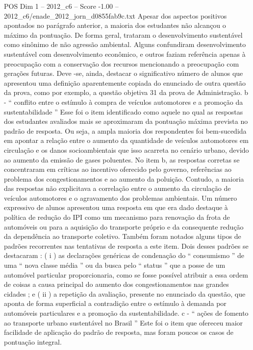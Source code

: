 \begin{textsample}{POS Dim 1 – 2012\_c6 – Score -1.00 – 2012\_c6/enade\_2012\_jorn\_d0855fab9c.txt}
Apesar dos aspectos positivos apontados no parágrafo anterior, a maioria dos estudantes não alcançou o máximo da pontuação.
De forma geral, trataram o desenvolvimento sustentável como sinônimo de não agressão ambiental.
Alguns confundiram desenvolvimento sustentável com desenvolvimento econômico, e outros faziam referência apenas à preocupação com a conservação dos recursos mencionando a preocupação com gerações futuras.
Deve -se, ainda, destacar o significativo número de alunos que apresentou uma definição aparentemente copiada do enunciado de outra questão da prova, como por exemplo, a questão objetiva 31 da prova de Administração. b - “ conflito entre o estímulo à compra de veículos automotores e a promoção da sustentabilidade ” Esse foi o item identificado como aquele no qual as respostas dos estudantes avaliados mais se aproximaram da pontuação máxima prevista no padrão de resposta.
Ou seja, a ampla maioria dos respondentes foi bem-sucedida em apontar a relação entre o aumento da quantidade de veículos automotores em circulação e os danos socioambientais que isso acarreta no cenário urbano, devido ao aumento da emissão de gases poluentes.
No item b, as respostas corretas se concentraram em críticas ao incentivo oferecido pelo governo, referências ao problema dos congestionamentos e ao aumento da poluição.
Contudo, a maioria das respostas não explicitava a correlação entre o aumento da circulação de veículos automotores e o agravamento dos problemas ambientais.
Um número expressivo de alunos apresentou uma resposta em que era dado destaque à política de redução do IPI como um mecanismo para renovação da frota de automóveis ou para a aquisição do transporte próprio e da consequente redução da dependência ao transporte coletivo.
Também foram notados alguns tipos de padrões recorrentes nas tentativas de resposta a este item.
Dois desses padrões se destacaram : ( i ) as declarações genéricas de condenação do “ consumismo ” de uma “ nova classe média ” ou da busca pelo “ status ” que a posse de um automóvel particular proporcionaria, como se fosse possível atribuir a essa ordem de coisas a causa principal do aumento dos congestionamentos nas grandes cidades ; e ( ii ) a repetição da avaliação, presente no enunciado da questão, que aponta de forma superficial a contradição entre o estímulo à demanda por automóveis particulares e a promoção da sustentabilidade. c - “ ações de fomento ao transporte urbano sustentável no Brasil ” Este foi o item que ofereceu maior facilidade de aplicação do padrão de resposta, mas foram poucos os casos de pontuação integral.

\end{textsample}
